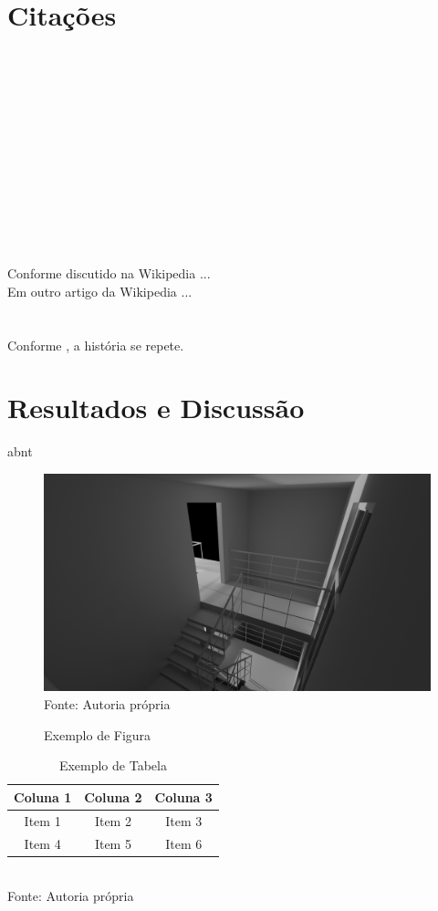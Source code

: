 \documentclass[12pt,a4paper,oneside,brazil]{abntex2}
\begin{document}
\chapter{Citações}
\cite{hawking1988}\\
\cite{feynman1963}\\
\cite{douglas2004}\\
\cite{knuth1997}\\
\cite{orwell1984}\\
\cite{einstein1935}\\
\cite{shannon1948}\\
\cite{latexWiki}\\
\cite{pythonOrg}\\
\cite{smith1992}\\
\\\\
Conforme discutido na Wikipedia \cite{luaWikipedia}...\\
Em outro artigo da Wikipedia \cite{terraWikipedia}...\\\\
\cite{exemploCincoAutores}\\
Conforme \cite{hi}, a história se repete.


\chapter{Resultados e Discussão}
\lipsum[10]
\gls{abnt}

\begin{figure}[ht]
    \centering
    \caption{Exemplo de Figura}
    \includegraphics[width=1.0\textwidth]{./src/assets/untitled.png}
    \label{fig:exemplo}
    \textnormal{\fontsize{10pt}{12pt}Fonte: Autoria própria}
\end{figure}

\begin{table}[ht]
    \centering
    \caption{Exemplo de Tabela}
    \begin{tabular}{|c|c|c|}
        \hline
        Coluna 1 & Coluna 2 & Coluna 3 \\ \hline
        Item 1   & Item 2   & Item 3   \\ \hline
        Item 4   & Item 5   & Item 6   \\ \hline
    \end{tabular}
    \label{tab:exemplo}
    \\\textnormal{\fontsize{10pt}{12pt}Fonte: Autoria própria}
\end{table}
\end{document}
